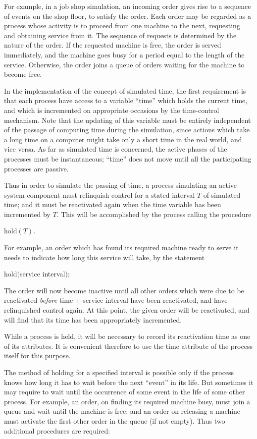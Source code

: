 \documentclass[twoside,11pt]{book}
\begin{document}
For example, in a job shop simulation, an incoming order gives rise to a sequence of events on the shop floor, to satisfy the order. Each order may be regarded as a process whose activity is to proceed from one machine to the next, requesting and obtaining service from it. The sequence of requests is determined by the nature of the order. If the requested machine is free, the order is served immediately, and the machine goes busy for a period equal to the length of the service. Otherwise, the order joins a queue of orders waiting for the machine to become free.

In the implementation of the concept of simulated time, the first requirement is that each process have access to a variable ``time'' which holds the current time, and which is incremented on appropriate occasions by the time-control mechanism. Note that the updating of this variable must be entirely independent of the passage of computing time during the simulation, since actions which take a long time on a computer might take only a short time in the real world, and vice versa. As far as simulated time is concerned, the active phases of the processes must be instantaneous; ``time'' does not move until all the participating processes are passive.

Thus in order to simulate the passing of time, a process simulating an active system component must relinquish control for a stated interval $T$ of simulated time; and it must be reactivated again when the time variable has been incremented by $T$. This will be accomplished by the process calling the procedure

\quad hold$(T)$.

For example, an order which has found its required machine ready to serve it needs to indicate how long this service will take, by the statement

\quad hold$($service interval$)$;

\noindent
The order will now become inactive until all other orders which were due to be reactivated \textit{before} time $+$ service interval have been reactivated, and have relinquished control again. At this point, the given order will be reactivated, and will find that its time has been appropriately incremented.

While a process is held, it will be necessary to record its reactivation time as one of its attributes. It is convenient therefore to use the time attribute of the process itself for this purpose.

The method of holding for a specified interval is possible only if the process knows how long it has to wait before the next ``event'' in its life. But sometimes it may require to wait until the occurrence of some event in the life of some other process. For example, an order, on finding its required machine busy, must join a queue and wait until the machine is free; and an order on releasing a machine must activate the first other order in the queue (if not empty). Thus two additional procedures are required:
\end{document}
